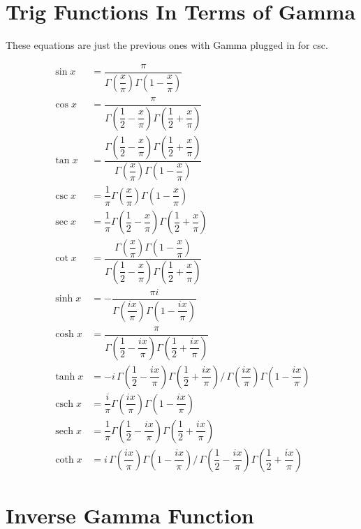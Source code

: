 \documentclass[12pt]{article}
\providecommand \pgrp [1] {\left( #1 \right)}   %
\DeclareMathOperator \csch {csch}
\DeclareMathOperator \sech {sech}
\begin{document}
\pagebreak
\section{Trig Functions In Terms of Gamma}

\noindent These equations are just the previous ones with Gamma plugged in for csc.

\begin{align} %
	\sin x & = \dfrac \pi{\Gamma\!\pgrp{\dfrac x\pi} \Gamma\!\pgrp{1 - \dfrac x\pi}}\\
	\cos x & = \dfrac\pi{\Gamma\!\pgrp{\dfrac 12 - \dfrac x\pi} \Gamma\!
		\pgrp{\dfrac 12 + \dfrac x\pi}}\\
	\tan x & = \dfrac{\Gamma\!\pgrp{\dfrac 12 - \dfrac x\pi} \Gamma\!\pgrp{\dfrac 12
		+ \dfrac x\pi }}{\Gamma\!\pgrp{\dfrac x\pi} \Gamma\!\pgrp{1 - \dfrac x\pi}}\\
	\csc x & = \dfrac 1\pi \Gamma\!\pgrp{\dfrac x\pi} \Gamma\!\pgrp{1 - \dfrac x\pi}\\
	\sec x & = \dfrac 1\pi \Gamma\!\pgrp{\dfrac 12 - \dfrac x\pi} \Gamma\!
		\pgrp{\dfrac 12 + \dfrac x\pi}\\
	\cot x & = \dfrac{\Gamma\!\pgrp{\dfrac x\pi}\Gamma\!\pgrp{1 - \dfrac x\pi}}{\Gamma
		\!\pgrp{\dfrac 12 - \dfrac x\pi} \Gamma\!\pgrp{\dfrac 12 + \dfrac x\pi}}\\
	\sinh x & = -\dfrac{\pi i}{\Gamma\!\pgrp{\dfrac{ix}\pi} \Gamma\!
		\pgrp{1 - \dfrac{ix}\pi}}\\
	\cosh x & = \dfrac \pi{\Gamma\!\pgrp{\dfrac 12 - \dfrac{ix}\pi}\Gamma\!
		\pgrp{\dfrac 12 + \dfrac{ix}\pi}}\\
	\tanh x & = -i\,\Gamma\!\pgrp{\dfrac 12 - \dfrac{ix}\pi} \Gamma\!
		\pgrp{\dfrac 12 + \dfrac{ix}\pi}\!\bigg/\,\Gamma\!\pgrp{\dfrac{ix}\pi}
		\Gamma\!\pgrp{1 - \dfrac{ix}\pi}\\
	\csch x & = \dfrac i\pi \Gamma\!\pgrp{\dfrac{ix}\pi} \Gamma\!
		\pgrp{1 - \dfrac{ix}\pi}\\
	\sech x & = \dfrac 1\pi \Gamma\!\pgrp{\dfrac 12 - \dfrac{ix}\pi} \Gamma\!
		\pgrp{\dfrac 12 + \dfrac{ix}\pi}\\
	\coth x & = i\,\Gamma\!\pgrp{\dfrac{ix}\pi} \Gamma\!\pgrp{1 - \dfrac{ix}\pi}
		\!\bigg/\,\Gamma\!\pgrp{\dfrac 12 - \dfrac{ix}\pi} \Gamma\!\pgrp
		{\dfrac 12 + \dfrac{ix}\pi}
\end{align}

\pagebreak
\section{Inverse Gamma Function}\label{sec:inverse gamma}
\end{document}
